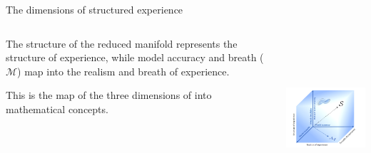  
  \begin{frame}{The dimensions of structured experience}
  \begin{columns}
\begin{column}{0.5\textwidth}
    
  The structure of the reduced manifold represents the structure of experience, while model accuracy and breath ($\mathcal M$) map into the realism and breath of experience.
\vspace{1cm}
  
  This is the map of the three dimensions of \SEP  into mathematical concepts. 
 
\end{column}
\begin{column}{0.5\textwidth}  
    \begin{center}
         \includegraphics[height=6cm]{img/3dKT2.png}
     \end{center}
\end{column}
\end{columns}

\end{frame}
